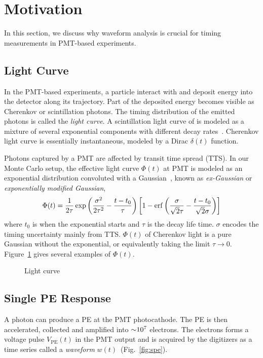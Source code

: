 \section{Motivation} %
\label{sec:toyMC}

In this section, we discuss why waveform analysis is crucial for timing measurements in PMT-based experiments. 

\subsection{Light Curve}
In the PMT-based experiments, a particle interact with and deposit energy into the detector along its trajectory. Part of the deposited energy becomes visible as Cherenkov or scintillation photons.  The timing distribution of the emitted photons is called the \textit{light curve}.  A scintillation light curve of is modeled as a mixture of several exponential components with different decay rates~\cite{ludhova_particle_2020}.  Cherenkov light curve is essentially instantaneous, modeled by a Dirac $\delta(t)$ function.

Photons captured by a PMT are affected by transit time spread (TTS).  In our Monte Carlo setup, the effective light curve $\Phi(t)$ at PMT is modeled as an exponential distribution convoluted with a Gaussian~\cite{li_separation_2016}, known as \textit{ex-Gaussian} or \textit{exponentially modified Gaussian},
\begin{align}
    \Phi(t) = \frac{1}{2\tau} \exp\left(\frac{\sigma^2}{2\tau^2}-\frac{t-t_0}{\tau}\right) \left[1 - \operatorname{erf}\left( \frac{\sigma}{\sqrt{2}\tau} - \frac{t-t_0}{\sqrt{2}\sigma} \right)\right]
    \label{eq:time-pro}
\end{align}
where $t_0$ is when the exponential starts and $\tau$ is the decay life time.  $\sigma$ encodes the timing uncertainty mainly from TTS.  $\Phi(t)$ of Cherenkov light is a pure Gaussian without the exponential, or equivalently taking the limit $\tau \rightarrow 0$.  Figure~\ref{fig:time-pro} gives several examples of $\Phi(t)$.

\begin{figure}
  \centering
  \resizebox{0.6\textwidth}{!}{}
  \caption{\label{fig:time-pro} Light curve}
\end{figure}

\subsection{Single PE Response}
A photon can produce a PE at the PMT photocathode.  The PE is then accelerated, collected and amplified into $\num[retain-unity-mantissa=false]{\sim 1e7}$ electrons.  The electrons forms a voltage pulse $V_\mathrm{PE}(t)$ in the PMT output and is acquired by the digitizers as a time series called a \textit{waveform} $w(t)$~(Fig.~\ref{fig:spe}).

